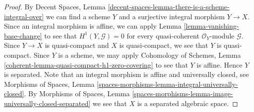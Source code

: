 \documentclass[10pt,a4paper]{amsart}
\theoremstyle{plain}
\theoremstyle{definition}
\theoremstyle{remark}
\numberwithin{equation}{subsection}
\begin{document}
\begin{proof}
By Decent Spaces, Lemma
\ref{decent-spaces-lemma-there-is-a-scheme-integral-over}
we can find a scheme $Y$ and a surjective integral morphism
$Y \to X$. Since an integral morphism is affine, we can apply
Lemma \ref{lemma-vanishing-base-change}
to see that $H^1(Y, \mathcal{G}) = 0$ for every
quasi-coherent $\mathcal{O}_Y$-module $\mathcal{G}$.
Since $Y \to X$ is quasi-compact and $X$ is quasi-compact,
we see that $Y$ is quasi-compact.
Since $Y$ is a scheme, we may apply
Cohomology of Schemes, Lemma
\ref{coherent-lemma-quasi-compact-h1-zero-covering}
to see that $Y$ is affine. Hence $Y$ is separated.
Note that an integral morphism is affine and universally closed, see
Morphisms of Spaces, Lemma
\ref{spaces-morphisms-lemma-integral-universally-closed}.
By Morphisms of Spaces, Lemma
\ref{spaces-morphisms-lemma-image-universally-closed-separated}
we see that $X$ is a separated algebraic space.
\end{proof}
\end{document}
